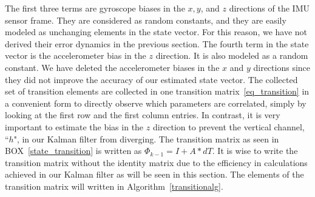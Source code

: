\documentclass[journal]{IEEEtran}
\begin{document}
The first three terms are gyroscope biases in the $x, y$, and $z$ directions of the IMU sensor frame. They are considered as random constants, and they are easily modeled as unchanging elements in the state vector. For this reason, we have not derived their error dynamics in the previous section. The fourth term in the state vector is the accelerometer bias in the $z$ direction. It is also modeled as a random constant. We have deleted the
accelerometer biases in the $x$ and $y$ directions since they did not improve the accuracy of our estimated state vector. The collected set of transition elements are collected in one transition matrix~\eqref{eq_transition} in a convenient form to directly observe which parameters are correlated, simply by looking at the first row and the first column entries.
In contrast, it is very important to estimate the bias in the $z$ direction to prevent the vertical channel, ``$h$", in our Kalman filter from diverging. The transition matrix as seen in BOX~\ref{state_transition} is written as $\Phi_{k-1}=I +A*dT$. It is wise to write the transition matrix without the identity matrix  due to the efficiency in calculations achieved in our Kalman filter as will be seen in this section. The elements of the transition matrix will written in Algorithm~\ref{transitionalg}.
\setcounter{MaxMatrixCols}{20}
\end{document}
